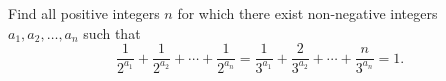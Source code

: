 Find all positive integers 
$n$
 for which there exist non-negative integers 
$a_1, a_2, \ldots, a_n$
 such that
\[
\frac{1}{2^{a_1}} + \frac{1}{2^{a_2}} + \cdots + \frac{1}{2^{a_n}} = 
\frac{1}{3^{a_1}} + \frac{2}{3^{a_2}} + \cdots + \frac{n}{3^{a_n}} = 1.
\]
